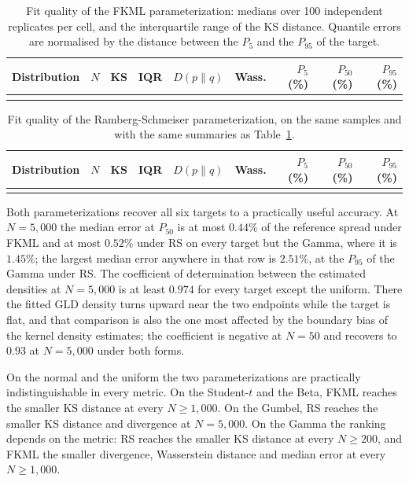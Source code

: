 \begin{table}[p]
\centering
\caption{Fit quality of the FKML parameterization: medians over 100 independent
replicates per cell, and the interquartile range of the KS distance. Quantile
errors are normalised by the distance between the $P_5$ and the $P_{95}$ of the
target.}
\label{tab:metrics_fkml}
\small
\setlength{\tabcolsep}{4.5pt}
\begin{tabular}{lrrrrrrrr}
\toprule
\textbf{Distribution} & \textbf{$N$} & \textbf{KS} & \textbf{IQR} & \textbf{$D(p\|q)$} &
\textbf{Wass.} & \textbf{$P_5$ (\%)} & \textbf{$P_{50}$ (\%)} & \textbf{$P_{95}$ (\%)} \\
\midrule
\unskip \\
\bottomrule
\end{tabular}
\end{table}

\begin{table}[p]
\centering
\caption{Fit quality of the Ramberg-Schmeiser parameterization, on the same
samples and with the same summaries as Table~\ref{tab:metrics_fkml}.}
\label{tab:metrics_rs}
\small
\setlength{\tabcolsep}{4.5pt}
\begin{tabular}{lrrrrrrrr}
\toprule
\textbf{Distribution} & \textbf{$N$} & \textbf{KS} & \textbf{IQR} & \textbf{$D(p\|q)$} &
\textbf{Wass.} & \textbf{$P_5$ (\%)} & \textbf{$P_{50}$ (\%)} & \textbf{$P_{95}$ (\%)} \\
\midrule
\unskip \\
\bottomrule
\end{tabular}
\end{table}

Both parameterizations recover all six targets to a practically useful accuracy.
At $N = 5{,}000$ the median error at $P_{50}$ is at most $0.44\%$ of the
reference spread under FKML and at most $0.52\%$ under RS on every target but
the Gamma, where it is $1.45\%$; the largest median error anywhere in that row is
$2.51\%$, at the $P_{95}$ of the Gamma under RS. The coefficient of determination
between the estimated densities at $N = 5{,}000$ is at least $0.974$ for every
target except the uniform. There the fitted GLD density turns upward near the two
endpoints while the target is flat, and that comparison is also the one most
affected by the boundary bias of the kernel density estimates; the coefficient
is negative at $N = 50$ and recovers to $0.93$ at $N = 5{,}000$ under both
forms.

On the normal and the uniform the two parameterizations are practically
indistinguishable in every metric. On the Student-$t$ and the Beta, FKML reaches
the smaller KS distance at every $N \geq 1{,}000$. On the Gumbel, RS reaches the
smaller KS distance and divergence at $N = 5{,}000$. On the Gamma the ranking
depends on the metric: RS reaches the smaller KS distance at every
$N \geq 200$, and FKML the smaller divergence, Wasserstein distance and median
error at every $N \geq 1{,}000$.

